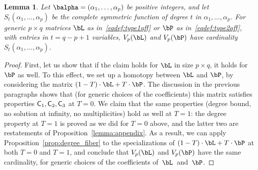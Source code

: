 \documentclass[12pt]{article}
\newtheorem{lemma}[definition]{Lemma}
\begin{document}
\begin{lemma}
  Let $\balpha=(\alpha_1,\dots,\alpha_p)$ be positive integers,  and
  let $S_{t}(\alpha_1,\dots,\alpha_p)$ be the complete symmetric
  function of degree $t$ in $\alpha_1,\dots,\alpha_p$. For generic $p
  \times q$ matrices $\bL$ as in~\eqref{eqdef:type1aff} or $\bP$ as
  in~\eqref{eqdef:type2aff}, with entries in $t=q-p+1$ variables,
$V_p(\bL)$ and $V_p(\bP)$ have
  cardinality $S_{t}(\alpha_1,\dots,\alpha_p)$.
\end{lemma}
\begin{proof}
  First, let us show that if the claim holds for $\bL$ in size $p
  \times q$, it holds for $\bP$ as well. To this effect, we set up a
  homotopy between $\bL$ and $\bP$, by considering the matrix
  $(1-T)\cdot\bL + T\cdot\bP$.  The discussion in the previous
  paragraphs shows that (for generic choices of the coefficients) this
  matrix satisfies properties $\mathsf{C}_1,\mathsf{C}_2,\mathsf{C}_3$ at $T=0$.  We claim
  that the same properties (degree bound, no solution at infinity, no
  multiplicities) hold as well at $T=1$: the degree property at $T=1$
  is proved as we did for $T=0$ above, and the latter two are
  restatements of Proposition~\ref{lemma:appendix}. As a result, we
  can apply Proposition~\ref{prop:degree_fiber} to the specializations
  of $(1-T)\cdot\bL + T\cdot\bP$ at both $T=0$ and $T=1$, and conclude
  that $V_p(\bL)$ and $V_p(\bP)$ have the same cardinality, for
  generic choices of the coefficients of~$\bL$~and~$\bP$.


\end{proof}
\end{document}

